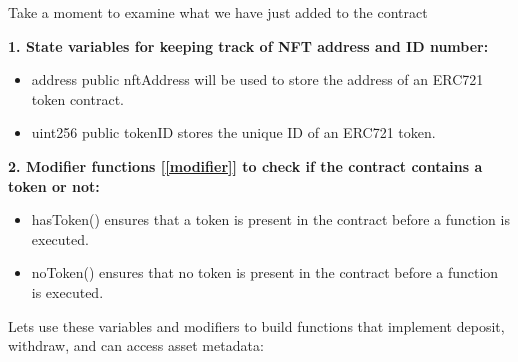 \documentclass{article}
\theoremstyle{theorem}
\theoremstyle{definition}
\theoremstyle{remark}
\begin{document}
\medskip\noindent
Take a moment to examine what we have just added to the contract

\medskip\noindent
\textbf{1. State variables for keeping track of NFT address and ID number:}
\begin{itemize}
    \item \colorbox{Gainsboro!60!Lavender}{address public nftAddress} will be used to store the address of an ERC721 token contract.
    \item  \colorbox{Gainsboro!60!Lavender}{uint256 public tokenID} stores the unique ID of an ERC721 token.
\end{itemize}
\textbf{2. Modifier functions [\ref{modifier}] to check if the contract contains a token or not:}
\begin{itemize}
    \item \colorbox{Gainsboro!60!Lavender}{hasToken()} ensures that a token is present in the contract before a function is executed.
    \item \colorbox{Gainsboro!60!Lavender}{noToken()} ensures that no token is present in the contract before a function is executed.
\end{itemize} 

\medskip\noindent
Lets use these variables and modifiers to build functions that implement deposit, withdraw, and can access asset metadata:
\end{document}
